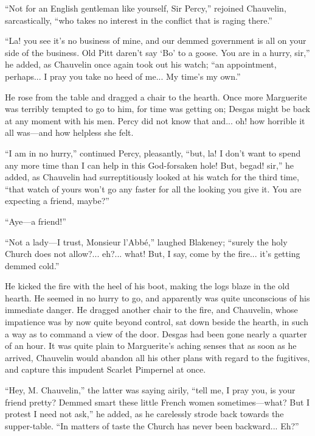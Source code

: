 \documentclass[paper=a5,BCOR=7mm,twoside,DIV=calc,12pt,usegeometry,chapterprefix,endperiod,headings=big]{scrbook}
\begin{document}
\enquote{Not for an English gentleman like yourself, Sir Percy,} rejoined Chauvelin, sarcastically, \enquote{who takes no interest in the conflict that is raging there.}

\enquote{La! you see it's no business of mine, and our demmed government is all on your side of the business. Old Pitt daren't say \enquote{Bo} to a goose. You are in a hurry, sir,} he added, as Chauvelin once again took out his watch; \enquote{an appointment, perhaps... I pray you take no heed of me... My time's my own.}

He rose from the table and dragged a chair to the hearth. Once more Marguerite was terribly tempted to go to him, for time was getting on; Desgas might be back at any moment with his men. Percy did not know that and... oh! how horrible it all was---and how helpless she felt.

\enquote{I am in no hurry,} continued Percy, pleasantly, \enquote{but, la! I don't want to spend any more time than I can help in this God-forsaken hole! But, begad! sir,} he added, as Chauvelin had surreptitiously looked at his watch for the third time, \enquote{that watch of yours won't go any faster for all the looking you give it. You are expecting a friend, maybe?}

\enquote{Aye---a friend!}

\enquote{Not a lady---I trust, Monsieur l'Abbé,} laughed Blakeney; \enquote{surely the holy Church does not allow?... eh?... what! But, I say, come by the fire... it's getting demmed cold.}

He kicked the fire with the heel of his boot, making the logs blaze in the old hearth. He seemed in no hurry to go, and apparently was quite unconscious of his immediate danger. He dragged another chair to the fire, and Chauvelin, whose impatience was by now quite beyond control, sat down beside the hearth, in such a way as to command a view of the door. Desgas had been gone nearly a quarter of an hour. It was quite plain to Marguerite's aching senses that as soon as he arrived, Chauvelin would abandon all his other plans with regard to the fugitives, and capture this impudent Scarlet Pimpernel at once.

\enquote{Hey, M. Chauvelin,} the latter was saying airily, \enquote{tell me, I pray you, is your friend pretty? Demmed smart these little French women sometimes---what? But I protest I need not ask,} he added, as he carelessly strode back towards the supper-table. \enquote{In matters of taste the Church has never been backward... Eh?}
\end{document}
